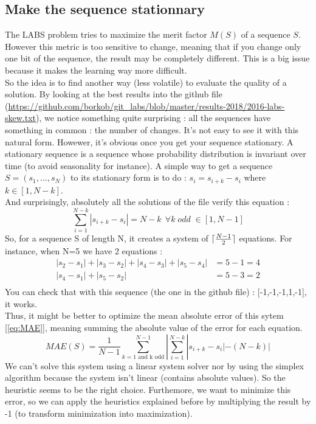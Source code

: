 \documentclass[a4paper,11pt,openany]{article}
\DeclarePairedDelimiter{\ceil}{\lceil}{\rceil}
\begin{document}
\subsection{Make the sequence stationnary}
\noindent
The LABS problem tries to maximize the merit factor $M(S)$ of a sequence $S$. However this metric is too sensitive to change, meaning that if you change only one bit of the sequence, the result may be completely different. This is a big issue because it makes the learning way more difficult.\\
So the idea is to find another way (less volatile) to evaluate the quality of a solution. By looking at the best results into the github file (\url{https://github.com/borkob/git_labs/blob/master/results-2018/2016-labs-skew.txt}), we notice something quite surprising : all the sequences have something in common : the number of changes. It's not easy to see it with this natural form. Howewer, it's obvious once you get your sequence stationary. A stationary sequence is a sequence whose probability distribution is invariant over time (to avoid seasonality for instance). A simple way to get a sequence $S=(s_1,...,s_N)$ to its stationary form is to do : $s_i=s_{i+k}-s_i$ where $k\in [1,N-k]$.\\
And surprisingly, absolutely all the solutions of the file verify this equation :
\begin{equation}
\sum_{i=1}^{N-k} |s_{i+k}-s_{i}|=N-k \;\, \forall k \; odd\; \in [1,N-1]
\end{equation}
So, for a sequence S of length N, it creates a system of $\ceil{\frac{N-1}{2}}$ equations. For instance, when N=5 we have 2 equations :
\begin{equation}
\begin{split}
|s_2-s_1|+|s_3-s_2|+|s_4-s_3|+|s_5-s_4|&=5-1=4\\
|s_4-s_1|+|s_5-s_2|&=5-3=2\\
\end{split}
\end{equation}
You can check that with this sequence (the one in the github file) : [-1,-1,-1,1,-1], it works.\\
Thus, it might be better to optimize the mean absolute error of this sytem [\ref{eq:MAE}], meaning summing the absolute value of the error for each equation.
\begin{equation}
\label{eq:MAE}
MAE(S)=\frac{1}{N-1}\sum_{k=1 \text{ and k odd}}^{N-1}|\sum_{i=1}^{N-k} |s_{i+k}-s_{i}|-(N-k)|
\end{equation}
We can't solve this system using a linear system solver nor by using the simplex algorithm because the system isn't linear (contains absolute values). So the heuristic seems to be the right choice.
Furthemore, we want to minimize this error, so we can apply the heuristics explained before by multiplying the result by -1 (to transform minimization into maximization).\\
\end{document}
